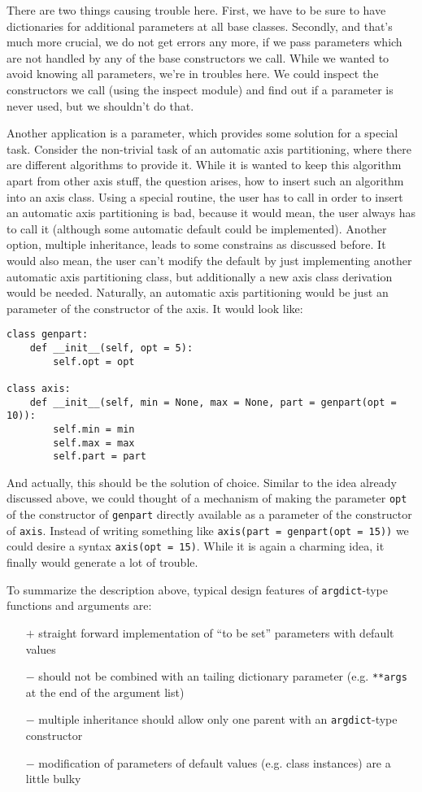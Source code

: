 \documentclass{article}
\begin{document}
There are two things causing trouble here. First, we have to be sure
to have dictionaries for additional parameters at all base classes.
Secondly, and that's much more crucial, we do not get errors any more,
if we pass parameters which are not handled by any of the base
constructors we call. While we wanted to avoid knowing all parameters,
we're in troubles here. We could inspect the constructors we call
(using the inspect module) and find out if a parameter is never used,
but we shouldn't do that.

Another application is a parameter, which provides some solution for a
special task. Consider the non-trivial task of an automatic axis
partitioning, where there are different algorithms to provide it.
While it is wanted to keep this algorithm apart from other axis stuff,
the question arises, how to insert such an algorithm into an axis
class. Using a special routine, the user has to call in order to
insert an automatic axis partitioning is bad, because it would mean, the
user always has to call it (although some automatic default could be
implemented). Another option, multiple inheritance, leads to some
constrains as discussed before. It would also mean, the user can't
modify the default by just implementing another automatic axis
partitioning class, but additionally a new axis class derivation would
be needed. Naturally, an automatic axis partitioning would be just an
parameter of the constructor of the axis. It would look like:
\begin{verbatim}
class genpart:
    def __init__(self, opt = 5):
        self.opt = opt

class axis:
    def __init__(self, min = None, max = None, part = genpart(opt = 10)):
        self.min = min
        self.max = max
        self.part = part
\end{verbatim}

And actually, this should be the solution of choice. Similar to the
idea already discussed above, we could thought of a mechanism of
making the parameter \verb|opt| of the constructor of \verb|genpart|
directly available as a parameter of the constructor of \verb|axis|.
Instead of writing something like \verb|axis(part = genpart(opt = 15))| 
we could desire a syntax \verb|axis(opt = 15)|. While it is
again a charming idea, it finally would generate a lot of trouble.

To summarize the description above, typical design features of
\verb|argdict|-type functions and arguments are:
\begin{itemize}
\item[$+$]straight forward implementation of ``to be set'' parameters
with default values
\item[$-$]should not be combined with an tailing dictionary parameter
(e.g. \verb|**args| at the end of the argument list)
\item[$-$]multiple inheritance should allow only one parent with an
\verb|argdict|-type constructor
\item[$-$]modification of parameters of default values (e.g. class
instances) are a little bulky
\end{itemize}
\end{document}
